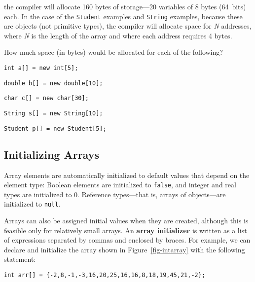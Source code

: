 \noindent the compiler will allocate 160 bytes of storage---20
variables of 8 bytes (64~bits) each.  In the case of the
  {\tt Student} examples and {\tt String}
examples, because these are objects (not primitive types), the
compiler will allocate space for {\it N} addresses, where {\it N} is
the length of the array and where each address requires 4 bytes.

\label{self-study-exercise}
\begin{SSTUDY}
\item  How much space  (in bytes) would be allocated
for each of the following?

\begin{EXRLL}
\item {\tt int a[] = new int[5];}    
\item {\tt double b[] = new double[10];}    
\item {\tt char c[] = new char[30];}        
\item {\tt String s[] = new String[10];}    
\item {\tt Student p[] = new Student[5];}  
\end{EXRLL}

\end{SSTUDY}

\subsection{Initializing Arrays}

\noindent Array elements are automatically initialized
to default values that depend on the element type:
Boolean elements are initialized to {\tt false}, and integer and real
types are initialized to 0. Reference types---that is, arrays of
objects---are initialized to {\tt null}.

Arrays can also be assigned initial values when they are created,
although this is feasible only for relatively small arrays.  An {\bf
array initializer} is written as a list of expressions separated by
commas and enclosed by braces.   For example, we can declare and
initialize the array shown in Figure~\ref{fig-intarray} with the
following statement:

\begin{jjjlisting}
\begin{lstlisting}
int arr[] = {-2,8,-1,-3,16,20,25,16,16,8,18,19,45,21,-2};
\end{lstlisting}
\end{jjjlisting}

